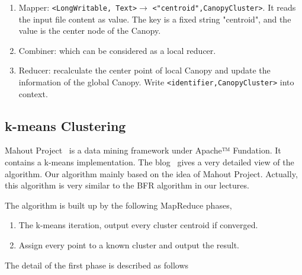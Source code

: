 \documentclass[a4paper,11pt]{article}
\begin{document}
\begin{enumerate}
    \item Mapper: \verb|<LongWritable, Text>|$\rightarrow$
    \verb|<"centroid",CanopyCluster>|. It reads the input file content as
    value. The key is a fixed string "centroid", and the value is the center
    node of the Canopy.
    \item Combiner: which can be considered as a local reducer.
    \item Reducer: recalculate the center point of local Canopy and update the
    information of the global Canopy. Write \verb|<identifier,CanopyCluster>| into context.
\end{enumerate}

\subsection{k-means Clustering}
Mahout Project~\cite{apache:mahout} is a data mining framework under Apache™
Fundation. It contains a k-means implementation. The blog~\cite{algo:kmeans3}
gives a very detailed view of the algorithm. Our algorithm mainly based on the
idea of Mahout Project. Actually, this algorithm is very similar to the BFR
algorithm in our lectures.

The algorithm is built up by the following MapReduce phases,
\begin{enumerate}
  \item The k-means iteration, output every cluster centroid if
  converged.  	
  \item Assign every point to a known cluster and output the result.
\end{enumerate}

The detail of the first phase is described as follows
\end{document}
